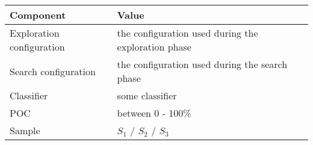 \begin{tabular}{ll}
\hline
Component                    & Value         \\
\hline
Exploration configuration   & the configuration used during the exploration phase     \\
Search configuration        & the configuration used during the search phase          \\
Classifier                  & some classifier          \\
POC                         & between 0 - 100\%          \\
Sample                      & $S_1$ / $S_2$ / $S_3$         \\
\hline
\end{tabular}